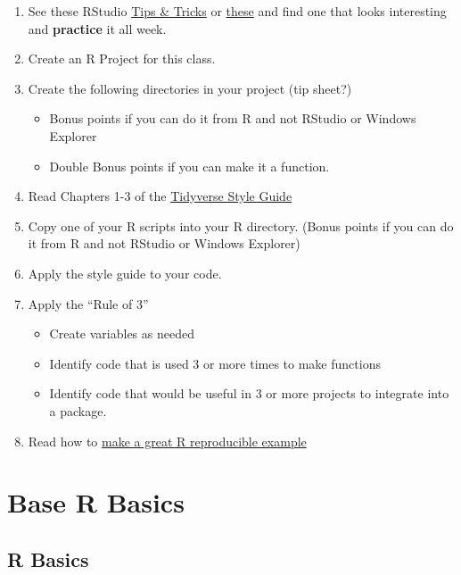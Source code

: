 \documentclass[]{book}
\providecommand{\tightlist}{%
  \setlength{\itemsep}{0pt}\setlength{\parskip}{0pt}}
\theoremstyle{definition}
\theoremstyle{definition}
\theoremstyle{definition}
\theoremstyle{remark}
\begin{document}
\begin{enumerate}
\def\labelenumi{\arabic{enumi}.}
\tightlist
\item
  See these RStudio
  \href{https://rviews.rstudio.com/categories/tips-and-tricks/}{Tips \&
  Tricks} or \href{https://twitter.com/rstudiotips}{these} and find one
  that looks interesting and \textbf{practice} it all week.
\item
  Create an R Project for this class.
\item
  Create the following directories in your project (tip sheet?)

  \begin{itemize}
  \tightlist
  \item
    Bonus points if you can do it from R and not RStudio or Windows
    Explorer
  \item
    Double Bonus points if you can make it a function.
  \end{itemize}
\item
  Read Chapters 1-3 of the
  \href{http://style.tidyverse.org/index.html}{Tidyverse Style Guide}
\item
  Copy one of your R scripts into your R directory. (Bonus points if you
  can do it from R and not RStudio or Windows Explorer)
\item
  Apply the style guide to your code.\\
\item
  Apply the ``Rule of 3''

  \begin{itemize}
  \tightlist
  \item
    Create variables as needed
  \item
    Identify code that is used 3 or more times to make functions
  \item
    Identify code that would be useful in 3 or more projects to
    integrate into a package.
  \end{itemize}
\item
  Read how to
  \href{https://stackoverflow.com/questions/5963269/how-to-make-a-great-r-reproducible-example}{make
  a great R reproducible example}
\end{enumerate}

\hypertarget{part-base-r-basics}{%
\part{Base R Basics}\label{part-base-r-basics}}

\hypertarget{baser-rbasics}{%
\chapter{R Basics}\label{baser-rbasics}}
\end{document}
